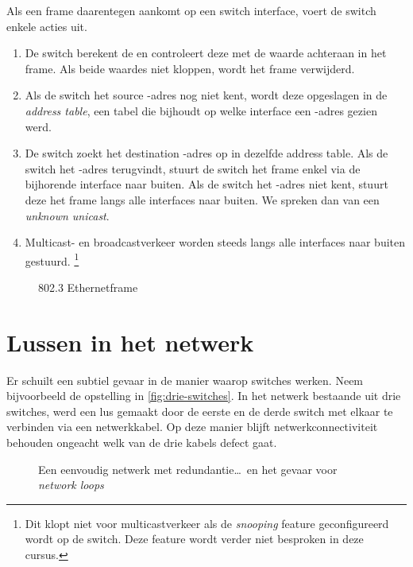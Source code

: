 Als een frame daarentegen aankomt op een switch interface, voert de switch enkele acties uit.
\begin{enumerate}
    \item
    De switch berekent de  en controleert deze met de waarde achteraan in het frame. Als beide waardes niet kloppen, wordt het frame verwijderd.
    
    \item
    Als de switch het source -adres nog niet kent, wordt deze opgeslagen in de  \emph{address table}, een tabel die bijhoudt op welke interface een -adres gezien werd.
    
    \item
    De switch zoekt het destination -adres op in dezelfde  address table.
    Als de switch het -adres terugvindt, stuurt de switch het frame enkel via de bijhorende interface naar buiten.
    Als de switch het -adres niet kent, stuurt deze het frame langs alle interfaces naar buiten.
    We spreken dan van een \emph{unknown unicast}.
    
    \item
    Multicast- en broadcastverkeer worden steeds langs alle interfaces naar buiten gestuurd.%
    \footnote{Dit klopt niet voor multicastverkeer als de  \emph{snooping} feature geconfigureerd wordt op de switch. Deze feature wordt verder niet besproken in deze cursus.}
\end{enumerate}

\begin{figure}
    \centering
    
    \caption{802.3 Ethernetframe}
    \label{fig:ethernet-frame}
\end{figure}



\section{Lussen in het netwerk}
\label{sec:stp}

Er schuilt een subtiel gevaar in de manier waarop switches werken.
Neem bijvoorbeeld de opstelling in \vref{fig:drie-switches}.
In het netwerk bestaande uit drie switches, werd een lus gemaakt door de eerste en de derde switch met elkaar te verbinden via een netwerkkabel.
Op deze manier blijft netwerkconnectiviteit behouden ongeacht welk van de drie kabels defect gaat.


\begin{figure}
    \centering
    
    \caption{Een eenvoudig netwerk met redundantie\ldots\ en het gevaar voor \emph{network loops}}
    \label{fig:drie-switches}
\end{figure}



